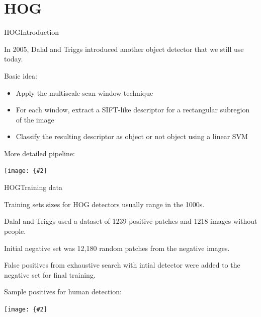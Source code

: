 \documentclass[aspectratio=169]{beamer}
\newcommand{\myfig}[3]{\centerline{\texttt{[image: \{\#2]}}}
\begin{document}
\section{HOG}

\begin{frame}{HOG}{Introduction}

  In 2005, Dalal and Triggs introduced another object detector that we
  still use today.

  \medskip

  Basic idea:
  \begin{itemize}
  \item Apply the multiscale scan window technique
  \item For each window, extract a SIFT-like descriptor for a rectangular
    subregion of the image
  \item Classify the resulting descriptor as object or not object using a linear SVM
  \end{itemize}

  More detailed pipeline:

  \medskip
  
  \myfig{4.5in}{dalal-fig1}{Dalal and Triggs (2005), Fig.\ 1}
  
\end{frame}


\begin{frame}{HOG}{Training data}

  Training sets sizes for HOG detectors usually range in the 1000s.

  \medskip

  Dalal and Triggs used a dataset of 1239 positive patches and 1218
  images without people.

  \medskip

  Initial negative set was 12,180 random patches from the negative images.

  \medskip

  False positives from exhaustive search with intial detector were
  added to the negative set for final training.

  \medskip
  
  Sample positives for human detection:

  \medskip

  \myfig{4.5in}{dalal-fig2}{Dalal and Triggs (2005), Fig.\ 2}

\end{frame}
\end{document}
